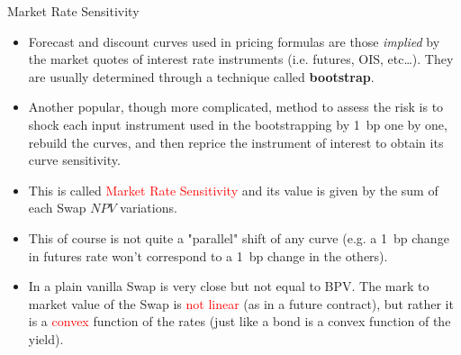 \documentclass{beamer}
\begin{document}
\begin{frame}{Market Rate Sensitivity}
\begin{itemize}
	\item<0-> Forecast and discount curves used in pricing formulas are those \emph{implied} by the market quotes of interest rate instruments (i.e. futures, OIS, etc\ldots). They are usually determined through a technique called \textbf{bootstrap}.
	\item<1-> Another popular, though more complicated, method to assess the risk is to shock each input instrument used in the bootstrapping by 1~bp one by one, rebuild the curves, and then reprice the instrument of interest to obtain its curve sensitivity. 
	\item<2-> This is called \textcolor{red}{Market Rate Sensitivity} and its value is given by the sum of each Swap $NPV$ variations.
	\item<3-> This of course is not quite a "parallel" shift of any curve (e.g. a 1~bp change in futures rate won't correspond to a 1~bp change in the others).
	\item<4-> In a plain vanilla Swap is very close but not equal to BPV. The mark to market value of the Swap is \textcolor{red}{not linear} (as in a future contract), but rather it is a \textcolor{red}{convex} function of the rates (just like a bond is a convex function of the yield).
\end{itemize}
\end{frame}
\end{document}
